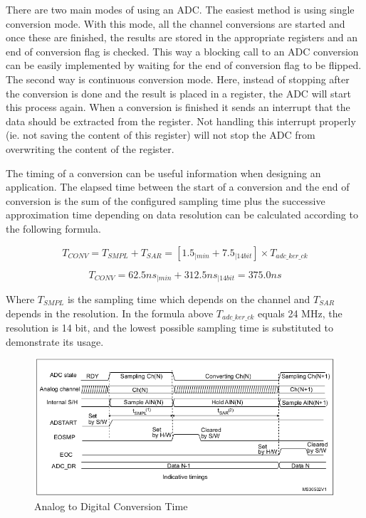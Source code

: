 There are two main modes of using an ADC. The easiest method is using single conversion mode. With this mode, all the channel conversions are started and once these are finished, the results are stored in the appropriate registers and an end of conversion flag is checked. This way a blocking call to an ADC conversion can be easily implemented by waiting for the end of conversion flag to be flipped. The second way is continuous conversion mode. Here, instead of stopping after the conversion is done and the result is placed in a register, the ADC will start this process again. When a conversion is finished it sends an interrupt that the data should be extracted from the register. Not handling this interrupt properly (ie. not saving the content of this register) will not stop the ADC from overwriting the content of the register.

The timing of a conversion can be useful information when designing an application. The elapsed time between the start of a conversion and the end of conversion is the sum of the configured sampling time plus the successive approximation time depending on data resolution can be calculated according to the following formula.

\[T_{CONV} = T_{SMPL} + T_{SAR} = [1.5_{|min} + 7.5_{|14bit}] \times T_{adc\_ker\_ck}\]

\[ T_{CONV} = 62.5 ns_{|min} + 312.5 ns_{|14bit} = 375.0 ns\]

Where $T_{SMPL}$ is the sampling time which depends on the channel and $T_{SAR}$ depends in the resolution. In the formula above $T_{adc\_ker\_ck}$ equals 24 MHz, the resolution is 14 bit, and the lowest possible sampling time is substituted to demonstrate its usage.

\begin{figure}[!ht]
    \centering
    \includegraphics[width=150mm, keepaspectratio]{figures/adc-timing.png}
    \caption{Analog to Digital Conversion Time\cite{ADConversionTime}}
    \label{fig:adc-timing}
\end{figure}

